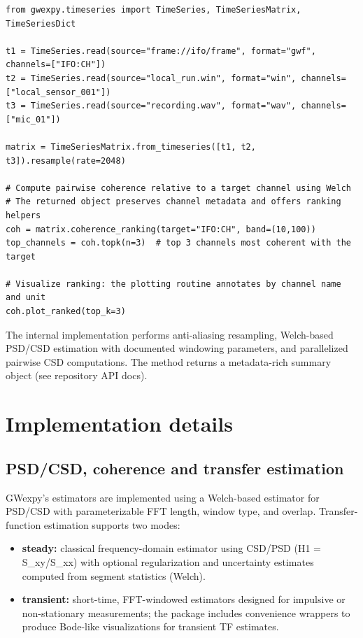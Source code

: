 \documentclass[preprint,12pt,a4paper]{elsarticle}
\begin{document}
\begin{lstlisting}[caption={Heterogeneous fusion and coherence-ranking}]
from gwexpy.timeseries import TimeSeries, TimeSeriesMatrix, TimeSeriesDict

t1 = TimeSeries.read(source="frame://ifo/frame", format="gwf", channels=["IFO:CH"])
t2 = TimeSeries.read(source="local_run.win", format="win", channels=["local_sensor_001"])
t3 = TimeSeries.read(source="recording.wav", format="wav", channels=["mic_01"])

matrix = TimeSeriesMatrix.from_timeseries([t1, t2, t3]).resample(rate=2048)

# Compute pairwise coherence relative to a target channel using Welch
# The returned object preserves channel metadata and offers ranking helpers
coh = matrix.coherence_ranking(target="IFO:CH", band=(10,100))
top_channels = coh.topk(n=3)  # top 3 channels most coherent with the target

# Visualize ranking: the plotting routine annotates by channel name and unit
coh.plot_ranked(top_k=3)
\end{lstlisting}

The internal implementation performs anti-aliasing resampling, Welch-based PSD/CSD estimation with documented windowing parameters, and parallelized pairwise CSD computations.  The method returns a metadata-rich summary object (see repository API docs).

\section{Implementation details}

\subsection{PSD/CSD, coherence and transfer estimation}
GWexpy's estimators are implemented using a Welch-based estimator for PSD/CSD with parameterizable FFT length, window type, and overlap.  Transfer-function estimation supports two modes:

\begin{itemize}
  \item \textbf{steady:} classical frequency-domain estimator using CSD/PSD (H1 = S\_{xy}/S\_{xx}) with optional regularization and uncertainty estimates computed from segment statistics (Welch).
  \item \textbf{transient:} short-time, FFT-windowed estimators designed for impulsive or non-stationary measurements; the package includes convenience wrappers to produce Bode-like visualizations for transient TF estimates.
\end{itemize}
\end{document}
